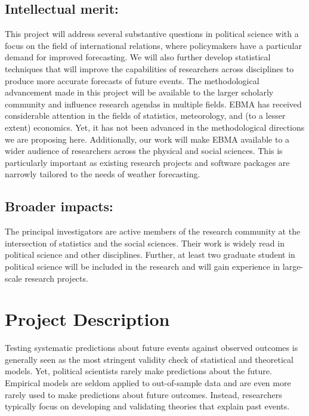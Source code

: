 \documentclass[pdftex,12pt,fullpage,oneside]{amsart}
\begin{document}

\subsection*{Intellectual merit:} 
This project will address several substantive questions in political
science with a focus on the field of international relations, where
policymakers have a particular demand for improved forecasting.  We
will also further develop statistical techniques that will improve the
capabilities of researchers across disciplines to produce more
accurate forecasts of future events. The methodological advancement
made in this project will be available to the larger scholarly
community and influence research agendas in multiple fields.  EBMA has
received considerable attention in the fields of statistics,
meteorology, and (to a lesser extent) economics.  Yet, it has not been
advanced in the methodological directions we are proposing here.
Additionally, our work will make EBMA available to a wider
audience of researchers across the physical and social sciences.  This
is particularly important as existing research projects and software
packages are narrowly tailored to the needs of weather forecasting.

\subsection*{Broader impacts:}
The principal investigators are active members of the research
community at the intersection of statistics and the social
sciences. Their work is widely read in political science and other
disciplines. Further, at least two graduate student in political
science will be included in the research and will gain experience in
large-scale research projects. 



 \newpage \setcounter{page}{1}

\section*{Project Description}

Testing systematic predictions about future events against observed
outcomes is generally seen as the most stringent validity check of
statistical and theoretical models.  Yet, political scientists rarely
make predictions about the future.  Empirical models are seldom
applied to out-of-sample data and are even more rarely used to make
predictions about future outcomes. Instead, researchers typically
focus on developing and validating theories that explain past events.
\end{document}
